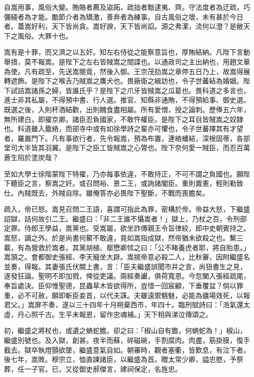 \begin{pinyinscope}
{{自嵩用事，風俗大變。賄賂者薦及盜跖，疏拙者黜逮夷、齊。守法度者為迂疏，巧彌縫者為才能。勵節介者為矯激，善奔者為練事。自古風俗之壞，未有甚於今日者。蓋嵩好利，天下皆尚貪。嵩好諛，天下皆尚諂。源之弗潔，流何以澄？是敝天下之風俗。大罪十也。

嵩有是十罪，而又濟之以五奸。知左右侍從之能察意旨也，厚賄結納。凡陛下言動舉措，莫不報嵩。是陛下之左右皆賊嵩之間諜也。以通政司之主出納也，用趙文華為使。凡有疏至，先送嵩閱竟，然後入御。王宗茂劾嵩之章停五日乃上，故嵩得展轉遮飾。是陛下之喉舌乃賊嵩之鷹犬也。畏廠衛之緝訪也，令子世蕃結為婚姻。陛下試詰嵩諸孫之婦，皆誰氏乎？是陛下之爪牙皆賊嵩之瓜葛也。畏科道之多言也，進士非其私屬，不得預中書、行人選。推官、知縣非通賄，不得預給事、御史選。既選之後，入則杯酒結歡，出則餽食盡相屬。所有愛憎，授之論刺。歷俸五六年，無所建白，即擢京卿。諸臣忍負國家，不敢忤權臣。是陛下之耳目皆賊嵩之奴隸也。科道雖入籠絡，而部寺中或有如徐學詩之輩亦可懼也，令子世蕃擇其有才望者，羅置門下。凡有事欲行者，先令報嵩，預為布置，連絡蟠結，深根固蒂，各部堂司大半皆其羽翼。是陛下之臣工皆賊嵩之心膂也。陛下奈何愛一賊臣，而忍百萬蒼生陷於塗炭哉？

至如大學士徐階蒙陛下特擢，乃亦每事依違，不敢持正，不可不謂之負國也。願陛下聽臣之言，察嵩之奸。或召問裕、景二王，或詢諸閣臣。重則置憲，輕則勒致仕。內賊既去，外賊自除。雖俺答亦必畏陛下聖斷，不戰而喪膽矣。

疏入，帝已怒。嵩見召問二王語，喜謂可指此為罪，密構於帝。帝益大怒，下繼盛詔獄，詰何故引二王。繼盛曰：「非二王誰不懾嵩者！」獄上，乃杖之百，令刑部定罪。侍郎王學益，嵩黨也。受嵩屬，欲坐詐傳親王令旨律絞，郎中史朝賓持之。嵩怒，謫之外。於是尚書何鰲不敢違，竟如嵩指成獄，然帝猶未欲殺之也。繫三載，有為營救於嵩者。其黨胡植、鄢懋卿怵之曰：「公不睹養虎者耶，將自貽患。」嵩頷之。會都御史張經、李天寵坐大辟。嵩揣帝意必殺二人，比秋審，因附繼盛名並奏，得報。其妻張氏伏闕上書，言：「臣夫繼盛誤聞市井之言，尚狃書生之見，遂發狂論。聖明不即加戮，俾從吏議。兩經奏讞，俱荷寬恩。今忽闌入張經疏尾，奉旨處決。臣仰惟聖德，昆蟲草木皆欲得所，豈惜一回宸顧，下垂覆盆？倘以罪重，必不可赦，願即斬臣妾首，以代夫誅。夫雖遠禦魑魅，必能為疆場效死，以報君父。」嵩屏不奏，遂以三十四年十月朔棄西市，年四十。臨刑賦詩曰：「浩氣還太虛，丹心照千古。生平未報恩，留作忠魂補。」天下相與涕泣傳頌之。

初，繼盛之將杖也，或遺之蚺蛇膽。卻之曰：「椒山自有膽，何蚺蛇為！」椒山，繼盛別號也。及入獄，創甚。夜半而蘇，碎磁碗，手割腐肉。肉盡，筋掛膜，復手截去。獄卒執燈顫欲墜，繼盛意氣自如。朝審時，觀者塞衢，皆歎息，有泣下者。後七年，嵩敗。穆宗立，恤直諫諸臣，以繼盛為首。贈太常少卿，謚忠愍，予祭葬，任一子官。已，又從御史郝傑言，建祠保定，名旌忠。

}}
\end{pinyinscope}
